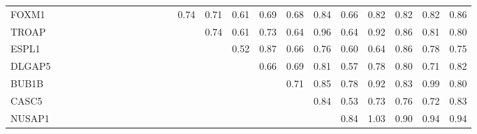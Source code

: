 \begin{longtable}{lrrrrrrrrrrrrrrrrrrrrrrr}
FOXM1  &              &            &             &            &             &              &             &            &            &             &             &             &        0.74 &        0.71 &         0.61 &        0.69 &        0.68 &         0.84 &        0.66 &        0.82 &         0.82 &        0.82 &        0.86 \\
TROAP  &              &            &             &            &             &              &             &            &            &             &             &             &             &        0.74 &         0.61 &        0.73 &        0.64 &         0.96 &        0.64 &        0.92 &         0.86 &        0.81 &        0.80 \\
ESPL1  &              &            &             &            &             &              &             &            &            &             &             &             &             &             &         0.52 &        0.87 &        0.66 &         0.76 &        0.60 &        0.64 &         0.86 &        0.78 &        0.75 \\
DLGAP5 &              &            &             &            &             &              &             &            &            &             &             &             &             &             &              &        0.66 &        0.69 &         0.81 &        0.57 &        0.78 &         0.80 &        0.71 &        0.82 \\
BUB1B  &              &            &             &            &             &              &             &            &            &             &             &             &             &             &              &             &        0.71 &         0.85 &        0.78 &        0.92 &         0.83 &        0.99 &        0.80 \\
CASC5  &              &            &             &            &             &              &             &            &            &             &             &             &             &             &              &             &             &         0.84 &        0.53 &        0.73 &         0.76 &        0.72 &        0.83 \\
NUSAP1 &              &            &             &            &             &              &             &            &            &             &             &             &             &             &              &             &             &              &        0.84 &        1.03 &         0.90 &        0.94 &        0.94 \\

\end{longtable}
